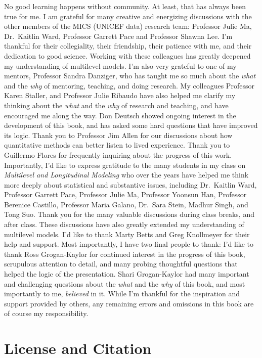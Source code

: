 \documentclass[
  letterpaper,
  DIV=11,
  numbers=noendperiod]{scrreprt}
\begin{document}
No good learning happens without community. At least, that has always
been true for me. I am grateful for many creative and energizing
discussions with the other members of the MICS (UNICEF data) research
team: Professor Julie Ma, Dr.~Kaitlin Ward, Professor Garrett Pace and
Professor Shawna Lee. I'm thankful for their collegiality, their
friendship, their patience with me, and their dedication to good
science. Working with these colleagues has greatly deepened my
understanding of multilevel models. I'm also very grateful to one of my
mentors, Professor Sandra Danziger, who has taught me so much about the
\emph{what} and the \emph{why} of mentoring, teaching, and doing
research. My colleagues Professor Karen Staller, and Professor Julie
Ribaudo have also helped me clarify my thinking about the \emph{what}
and the \emph{why} of research and teaching, and have encouraged me
along the way. Don Deutsch showed ongoing interest in the development of
this book, and has asked some hard questions that have improved its
logic. Thank you to Professor Jim Allen for our discussions about how
quantitative methods can better listen to lived experience. Thank you to
Guillermo Flores for frequently inquiring about the progress of this
work. Importantly, I'd like to express gratitude to the many students in
my class on \emph{Multilevel and Longitudinal Modeling} who over the
years have helped me think more deeply about statistical and substantive
issues, including Dr.~Kaitlin Ward, Professor Garrett Pace, Professor
Julie Ma, Professor Yoonsun Han, Professor Berenice Castillo, Professor
Maria Galano, Dr.~Sara Stein, Madhur Singh, and Tong Suo. Thank you for
the many valuable discussions during class breaks, and after class.
These discussions have also greatly extended my understanding of
multilevel models. I'd like to thank Marty Betts and Greg Knollmeyer for
their help and support. Most importantly, I have two final people to
thank: I'd like to thank Ross Grogan-Kaylor for continued interest in
the progress of this book, scrupulous attention to detail, and many
probing thoughtful questions that helped the logic of the presentation.
Shari Grogan-Kaylor had many important and challenging questions about
the \emph{what} and the \emph{why} of this book, and most importantly to
me, \emph{believed} in it. While I'm thankful for the inspiration and
support provided by others, any remaining errors and omissions in this
book are of course my responsibility.


\chapter*{License and Citation}\label{license-and-citation}
\end{document}
